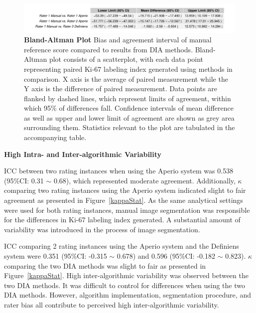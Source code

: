 \documentclass[final]{beamer}
\newlength{\onecolwid}
\begin{document}
\begin{frame}[t]
\begin{columns}[t]
\begin{column}{\onecolwid}
\begin{block}{}
\begin{figure}
\includegraphics[width = \linewidth]{baStat}

\centering
\caption{{\bf Bland-Altman Plot}
Bias and agreement interval of manual reference score compared to results from DIA methods. Bland-Altman plot consists of a scatterplot, with each data point representing paired Ki-67 labeling index generated using methods in comparison. X axis is the average of paired measurement while the Y axis is the difference of paired measurement. Data points are flanked by dashed lines, which represent limits of agreement, within which 95\% of differences fall. Confidence intervals of mean difference as well as upper and lower limit of agreement are shown as grey area surrounding them. Statistics relevant to the plot are tabulated in the accompanying table.
}
\label{baplot}
\end{figure}


{\bf High Intra- and Inter-algorithmic Variability}
\newline

ICC between two rating instances when using the Aperio system was 0.538 (95\%CI: 0.31 $\sim$ 0.68), which represented moderate agreement. Additionally, $\kappa$ comparing two rating instances using the Aperio system indicated slight to fair agreement as presented in Figure~\ref{kappaStat}. As the same analytical settings were used for both rating instances, manual image segmentation was responsible for the differences in Ki-67 labeling index generated. A substantial amount of variability was introduced in the process of image segmentation.


ICC comparing 2 rating instances using the Aperio system and the Definiens system were 0.351 (95\%CI: -0.315 $\sim$ 0.678) and 0.596 (95\%CI: -0.182 $\sim$ 0.823). $\kappa$ comparing the two DIA methods was slight to fair as presented in Figure~\ref{kappaStat}. High inter-algorithmic variability was observed between the two DIA methods. It was difficult to control for differences when using the two DIA methods. However, algorithm implementation, segmentation procedure, and rater bias all contribute to perceived high inter-algorithmic variability.






\end{block}
\end{column}



\end{columns}
\end{frame}
\end{document}
